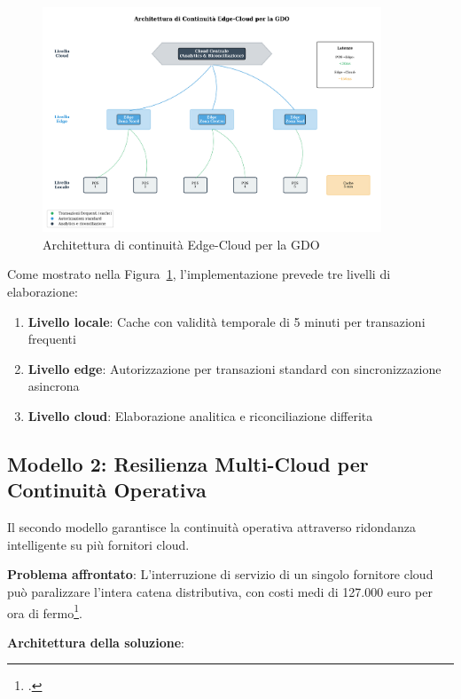 \begin{figure}[htbp]
\centering
\includegraphics[width=0.9\textwidth]{thesis_figures/cap4/fig_3_1_edge_cloud_architecture.pdf}
\caption{Architettura di continuità Edge-Cloud per la GDO}
\label{fig:edge-cloud}
\end{figure}

Come mostrato nella Figura~\ref{fig:edge-cloud}, l'implementazione prevede tre livelli di elaborazione:
\begin{enumerate}
    \item \textbf{Livello locale}: Cache con validità temporale di 5 minuti per transazioni frequenti
    \item \textbf{Livello edge}: Autorizzazione per transazioni standard con sincronizzazione asincrona  
    \item \textbf{Livello cloud}: Elaborazione analitica e riconciliazione differita
\end{enumerate}

\subsection{Modello 2: Resilienza Multi-Cloud per Continuità Operativa}
\label{subsec:multi-cloud}

Il secondo modello garantisce la continuità operativa attraverso ridondanza intelligente su più fornitori cloud.

\textbf{Problema affrontato}: L'interruzione di servizio di un singolo fornitore cloud può paralizzare l'intera catena distributiva, con costi medi di 127.000 euro per ora di fermo\footcite{Uptime2024}.

\textbf{Architettura della soluzione}:

